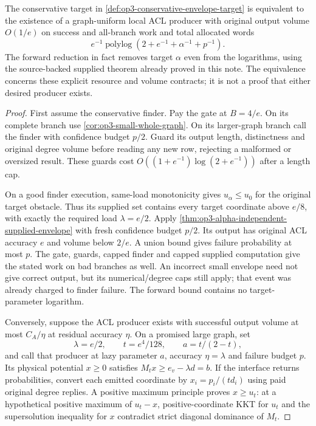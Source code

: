 \begin{theorem}
\label{thm:op3-conservative-envelope-equivalence}
The conservative target in
\cref{def:op3-conservative-envelope-target} is equivalent to the
existence of a graph-uniform local ACL producer with original output
volume $O(1/e)$ on success and all-branch work and total allocated words
\[
 e^{-1}\operatorname{polylog}(2+e^{-1}+\alpha^{-1}+p^{-1}).
\]
The forward reduction in fact removes target $\alpha$ even from the
logarithms, using the source-backed supplied theorem already proved in
this note. The equivalence concerns these explicit resource and volume
contracts; it is not a proof that either desired producer exists.
\end{theorem}
\begin{proof}
First assume the conservative finder. Pay the gate at $B=4/e$.
On its complete branch use \cref{cor:op3-small-whole-graph}.
On its larger-graph branch call the finder with confidence budget $p/2$.
Guard its output length, distinctness and original degree volume before
reading any new row, rejecting a malformed or oversized result. These
guards cost $O((1+e^{-1})\log(2+e^{-1}))$ after a length cap.

On a good finder execution, same-load monotonicity gives
$u_\alpha\leq u_0$ for the original target obstacle. Thus its supplied
set contains every target coordinate above $e/8$, with exactly the
required load $\lambda=e/2$. Apply
\cref{thm:op3-alpha-independent-supplied-envelope} with fresh confidence
budget $p/2$. Its output has original ACL accuracy $e$ and volume
below $2/e$. A union bound gives failure probability at most $p$.
The gate, guards, capped finder and capped supplied computation give
the stated work on bad branches as well. An incorrect small envelope
need not give correct output, but its numerical/degree caps still apply;
that event was already charged to finder failure. The forward bound
contains no target-parameter logarithm.

Conversely, suppose the ACL producer exists with successful output
volume at most $C_A/\eta$ at residual accuracy $\eta$. On a promised
large graph, set
\[
 \lambda=e/2,\qquad t=e^4/128,\qquad a=t/(2-t),
\]
and call that producer at lazy parameter $a$, accuracy $\eta=\lambda$
and failure budget $p$. Its physical potential $x\geq0$ satisfies
$M_tx\geq e_v-\lambda d=b$. If the interface returns probabilities,
convert each emitted coordinate by $x_i=p_i/(td_i)$ using paid original
degree replies. A positive maximum principle proves $x\geq u_t$:
at a hypothetical positive maximum of $u_t-x$, positive-coordinate
KKT for $u_t$ and the supersolution inequality for $x$ contradict
strict diagonal dominance of $M_t$.


\end{proof}
